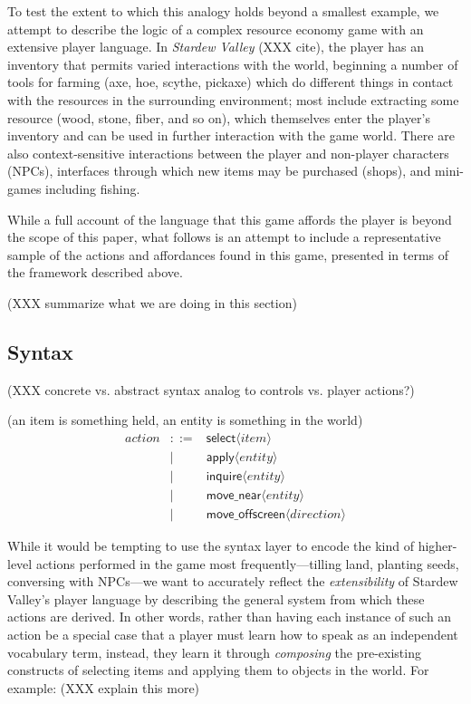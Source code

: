 To test the extent to which this analogy holds beyond a smallest example,
we attempt to describe the logic of a complex resource economy game with
an extensive player language. In {\em Stardew Valley} (XXX cite), the
player has an inventory that permits varied interactions with the world,
beginning a number of tools for farming (axe, hoe, scythe,
pickaxe) which do different things in contact with the resources in the
surrounding environment; most include extracting some resource (wood,
stone, fiber, and so on), which themselves enter the player's inventory and
can be used in further interaction with the game world. There are also
context-sensitive interactions between the player and non-player characters
(NPCs), interfaces through which new items may be purchased (shops), and
mini-games including fishing.

While a full account of the language that this game affords the player is
beyond the scope of this paper, what follows is an attempt to include a
representative sample of the actions and affordances found in this game,
presented in terms of the framework described above.

(XXX summarize what we are doing in this section)

\subsection{Syntax}


(XXX concrete vs. abstract syntax analog to controls vs. player actions?)

\newcommand{\param}[1]{\langle #1 \rangle}
\newcommand{\syn}[1]{\mathsf{#1}}

(an item is something held, an entity is something in the world)
\begin{eqnarray*}
action &::=& \syn{select} \param{item}\\
       &\mid& \syn{apply} \param{entity}\\
       &\mid& \syn{inquire} \param{entity}\\
       &\mid& \syn{move\_near} \param{entity}\\
       &\mid& \syn{move\_offscreen} \param{direction}
\end{eqnarray*}

While it would be tempting to use the syntax layer to encode the kind of
higher-level actions performed in the game most frequently---tilling land,
planting seeds, conversing with NPCs---we want to accurately reflect the
{\em extensibility} of Stardew Valley's player language by describing the
general system from which these actions are derived. In other words, rather
than having each instance of such an action be a special case that a player
must learn how to speak as an independent vocabulary term, instead, they
learn it through {\em composing} the pre-existing constructs of selecting items
and applying them to objects in the world. For example: (XXX explain this
more)

